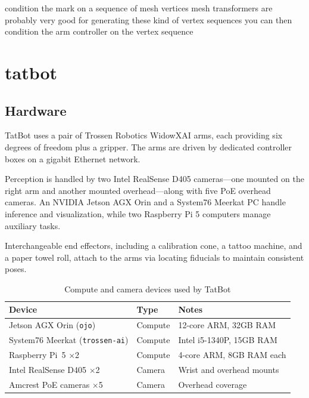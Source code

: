 \documentclass[11pt]{article}
\begin{document}
condition the mark on a sequence of mesh vertices
mesh transformers are probably very good for generating these kind of vertex sequences
you can then condition the arm controller on the vertex sequence

\pagebreak

\section{tatbot}

\subsection{Hardware}

TatBot uses a pair of Trossen Robotics WidowXAI arms, each providing six degrees of freedom plus a gripper. The arms are driven by dedicated controller boxes on a gigabit Ethernet network.

Perception is handled by two Intel RealSense D405 cameras---one mounted on the right arm and another mounted overhead---along with five PoE overhead cameras. An NVIDIA Jetson AGX Orin and a System76 Meerkat PC handle inference and visualization, while two Raspberry Pi 5 computers manage auxiliary tasks.

Interchangeable end effectors, including a calibration cone, a tattoo machine, and a paper towel roll, attach to the arms via locating fiducials to maintain consistent poses.

\begin{table}[h]
    \centering
    \caption{Compute and camera devices used by TatBot}
    \label{tab:hardware-devices}
    \begin{tabular}{lll}
        \toprule
        Device & Type & Notes \\
        \midrule
        Jetson AGX Orin (\texttt{ojo}) & Compute & 12-core ARM, 32GB RAM \\
        System76 Meerkat (\texttt{trossen-ai}) & Compute & Intel i5-1340P, 15GB RAM \\
        Raspberry Pi~5 $\times$2 & Compute & 4-core ARM, 8GB RAM each \\
        Intel RealSense D405 $\times$2 & Camera & Wrist and overhead mounts \\
        Amcrest PoE cameras $\times$5 & Camera & Overhead coverage \\
        \bottomrule
    \end{tabular}
\end{table}
\end{document}
